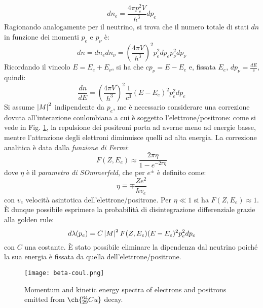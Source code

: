 \begin{equation}
	dn_e = \frac{4\pi p_e^2 V}{h^3} dp_e
	\label{eq:2.26}
\end{equation}
Ragionando analogamente per il neutrino, si trova che il numero totale di stati $ dn $ in funzione dei momenti $ p_e $ e $ p_{\nu} $ è:
\begin{equation}
	dn = dn_e dn_{\nu} = \left( \frac{4\pi V}{h^3} \right)^2 p_e^2 dp_e p_{\nu}^2 dp_{\nu}
	\label{eq:2.27}
\end{equation}
Ricordando il vincolo $ E = E_e + E_{\nu} $, si ha che $ cp_{\nu} = E - E_e $ e, fissata $ E_e $, $ dp_{\nu} = \frac{dE}{c} $, quindi:
\begin{equation}
	\frac{dn}{dE} = \left( \frac{4\pi V}{h^3} \right)^2 \frac{1}{c^3} (E - E_e)^2 p_e^2 dp_e
	\label{eq:2.28}
\end{equation}
Si assume $ \left\lvert M\right\rvert^2 $ indipendente da $ p_e $, me è necessario considerare una correzione dovuta all'interazione coulombiana a cui è soggetto l'elettrone/positrone: come si vede in Fig. \ref{beta-coul}, la repulsione dei positroni porta ad averne meno ad energie basse, mentre l'attrazione degli elettroni diminuisce quelli ad alta energia. La correzione analitica è data dalla \textit{funzione di Fermi}:
\begin{equation}
	F(Z,E_e) \approx \frac{2\pi \eta}{1 - e^{-2\pi \eta}}
	\label{eq:2.29}
\end{equation}
dove $ \eta $ è il \textit{parametro di SOmmerfeld}, che per $ e^{\pm} $ è definito come:
\begin{equation}
	\eta \equiv \mp \frac{Ze^2}{\hbar v_e}
	\label{eq:2.30}
\end{equation}
con $ v_e $ velocità asintotica dell'elettrone/positrone. Per $ \eta \ll 1 $ si ha $ F(Z,E_e) \approx 1 $.\\
È dunque possibile esprimere la probabilità di disintegrazione differenziale grazie alla golden rule:
\begin{equation}
	d\lambda(p_e) = C \left\lvert M\right\rvert^2 F(Z,E_e) (E - E_e)^2 p_e^2 dp_e
	\label{eq:2.31}
\end{equation}
con $ C $ una costante. È stato possibile eliminare la dipendenza dal neutrino poiché la sua energia è fissata da quella dell'elettrone/positrone.

\begin{figure}[b!]
	\centering
	\texttt{[image: beta-coul.png]}
	\caption{Momentum and kinetic energy spectra of electrons and positrons emitted from $ \ch{^{64}_{29}Cu} $ decay.}
	\label{beta-coul}
\end{figure}

